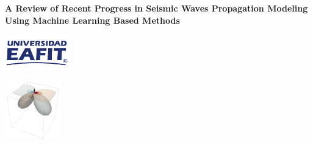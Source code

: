\documentclass[11pt,twoside]{article}
\begin{document}
\thispagestyle{empty}  



\vspace{-2mm} 
\begin{minipage}{9.5cm}
    \begin{center}
        \textbf{\large A Review of Recent Progress in Seismic Waves Propagation Modeling Using 
        Machine Learning Based Methods}  
    \end{center}                 
\end{minipage} 
\begin{minipage}{3.2cm}
    \begin{center}
        \hspace{-0.2cm}\includegraphics[width=2.8cm]{figs/format/Logo_EAFIT.pdf}
    \end{center}
\end{minipage}    
\begin{minipage}{2.2cm}
    \begin{center}
        \includegraphics[width=2.5cm]{figs/format/logo_grupo.pdf}
    \end{center}
\end{minipage}
\vspace{-2mm} 
\end{document}
